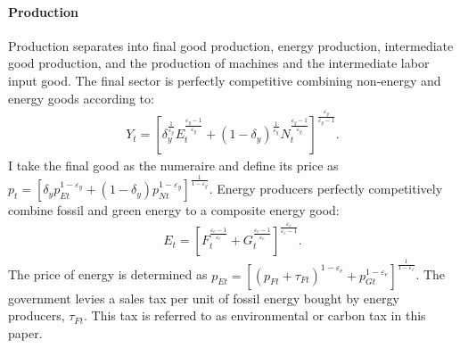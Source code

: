 
\paragraph{Production}
Production separates into final good production, energy production, intermediate good production, and the production of machines and the intermediate labor input good. 
The final sector is perfectly competitive combining  non-energy and energy goods according to:
\begin{align*}
Y_t=\left[\delta_y^\frac{1}{\varepsilon_y}E_{t}^{\frac{\varepsilon_y-1}{\varepsilon_y}}+(1-\delta_y)^\frac{1}{\varepsilon_y}N_{t}^{\frac{\varepsilon_y-1}{\varepsilon_y}}\right]^\frac{\varepsilon_y}{\varepsilon_y-1}.
\end{align*} 
I take the final good as the numeraire and define its price as $p_t=\left[\delta_yp_{Et}^{1-\varepsilon_y}+(1-\delta_y)p_{Nt}^{1-\varepsilon_y}\right]^{\frac{1}{1-\varepsilon_y}}$.
Energy producers perfectly competitively combine fossil and green energy to a composite energy good:
\begin{align*}
E_t=\left[F_t^\frac{\varepsilon_e-1}{\varepsilon_e}+G_t^\frac{\varepsilon_e-1}{\varepsilon_e}\right]^\frac{\varepsilon_e}{\varepsilon_e-1}.
\end{align*}
The price of energy is determined as  $p_{Et}= \left[(p_{Ft}+\tau_{Ft})^{1-\varepsilon_e}+p_{Gt}^{1-\varepsilon_e}\right]^\frac{1}{{1-\varepsilon_e}}$.
The government levies a sales tax per unit of fossil energy bought by energy producers, $\tau_{Ft}$. This tax is referred to as environmental or carbon tax in this paper. 

